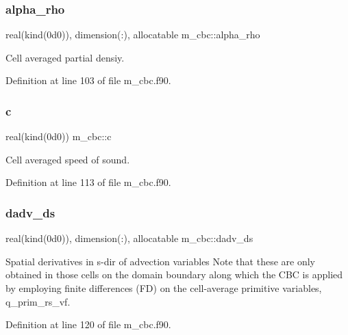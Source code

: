 \subsubsection{\texorpdfstring{alpha\+\_\+rho}{alpha\_rho}}
{\footnotesize\ttfamily real(kind(0d0)), dimension(\+:), allocatable m\+\_\+cbc\+::alpha\+\_\+rho}



Cell averaged partial densiy. 



Definition at line 103 of file m\+\_\+cbc.\+f90.

\mbox{\label{namespacem__cbc_a982b2364cfaa61896b8143231fc9e380}} 
\subsubsection{\texorpdfstring{c}{c}}
{\footnotesize\ttfamily real(kind(0d0)) m\+\_\+cbc\+::c}



Cell averaged speed of sound. 



Definition at line 113 of file m\+\_\+cbc.\+f90.

\mbox{\label{namespacem__cbc_ad0e1fd6e716ca51ccf5d6954e15fb02e}} 
\subsubsection{\texorpdfstring{dadv\+\_\+ds}{dadv\_ds}}
{\footnotesize\ttfamily real(kind(0d0)), dimension(\+:), allocatable m\+\_\+cbc\+::dadv\+\_\+ds}



Spatial derivatives in s-\/dir of advection variables Note that these are only obtained in those cells on the domain boundary along which the C\+BC is applied by employing finite differences (FD) on the cell-\/average primitive variables, q\+\_\+prim\+\_\+rs\+\_\+vf. 



Definition at line 120 of file m\+\_\+cbc.\+f90.

\mbox{\label{namespacem__cbc_a5d23c9c92bd474ce0a0d5af3c1f37cb8}} 
